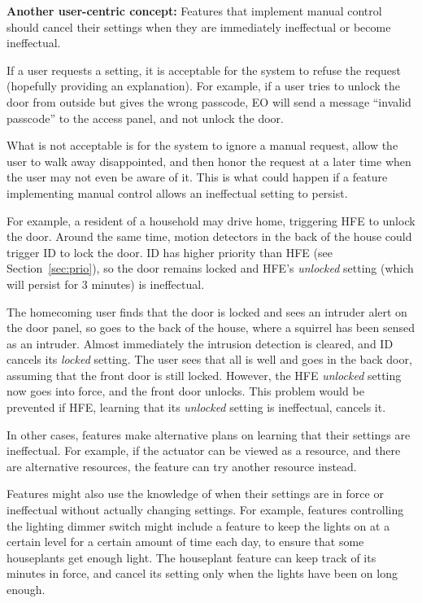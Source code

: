 \documentclass[conference]{IEEEtran}
\begin{document}
\vspace{2mm}
{\bf Another user-centric concept:}
Features that implement manual control should cancel their settings
when they are immediately ineffectual or become ineffectual.

If a user requests a setting, it is acceptable for the system
to refuse the request (hopefully providing an explanation).
For example, if a user tries to unlock the door from outside but gives
the wrong passcode, EO will send a message ``invalid passcode'' to the
access panel, and not unlock the door.

What is not acceptable is for the system to ignore a manual request,
allow the user to walk away disappointed, and then honor the request
at a later time when the user may not even be aware of it.
This is what could happen if a feature implementing manual control
allows an ineffectual setting to persist.

For example, a resident of a household may drive home, triggering
HFE to unlock the door.
Around the same time, motion detectors in the back of the house
could trigger ID to lock the door.
ID has higher priority than HFE (see
Section~\ref{sec:prio}), so the door remains locked and 
HFE's {\it unlocked} setting (which will persist for 3 minutes) 
is ineffectual.

The homecoming user finds that the door is locked and sees an intruder
alert on the door panel, so goes to the back of the house, where a
squirrel has been sensed as an intruder.
Almost immediately the intrusion detection is cleared, and ID
cancels its {\it locked} setting.
The user sees that all is well and goes in the back door,
assuming that the front door is still locked.
However, 
the HFE {\it unlocked} setting now goes into force,
and the front door unlocks.
This problem would be prevented if HFE, learning that its {\it unlocked}
setting is ineffectual, cancels it.

\vspace{2mm}
In other cases, features make alternative plans on learning that
their settings are ineffectual.
For example, if the actuator can be viewed as a resource, and
there are alternative resources, the feature can try another
resource instead.

Features might also use the knowledge of when their settings are
in force or ineffectual without actually changing settings.
For example, features controlling the lighting dimmer switch might
include a feature to keep the lights on at a certain level for a
certain amount of time each day, to ensure that some houseplants
get enough light.
The houseplant feature can keep track of its minutes in force, and
cancel its setting only when the lights have been on
long enough.
\end{document}
